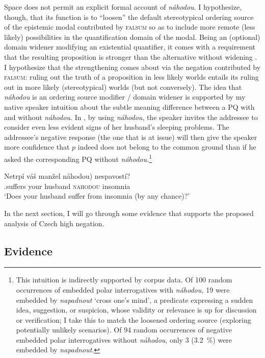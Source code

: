\documentclass[output=paper,colorlinks,citecolor=brown]{langscibook}
\begin{document}
\noindent Space does not permit an explicit formal account of \textit{náhodou}. I hypothesize, though, that its function is to ``loosen'' the default stereotypical ordering source \citep{Kratzer1991} of the epistemic modal contributed by \textsc{falsum} so as to include more remote (less likely) possibilities in the quantification domain of the modal. Being an (optional) domain widener modifying an existential quantifier, it comes with a requirement that the resulting proposition is stronger than the alternative without widening \citep{Kadmon.Landman1993,krifka1995semantics}. I hypothesize that the strengthening comes about via the negation contributed by \textsc{falsum}: ruling out the truth of a proposition in less likely worlds entails its ruling out in more likely (stereotypical) worlds (but not conversely). The idea that \textit{náhodou} is an ordering source modifier / domain widener is supported by my native speaker intuition about the subtle meaning difference between a PQ with and without \textit{náhodou.} In , by using \textit{náhodou}, the speaker invites the addressee to consider even less evident signs of her husband's sleeping problems. The addressee's negative response (the one that is at issue) will then give the speaker more confidence that $p$ indeed does not belong to the common ground than if he asked the corresponding PQ without \textit{náhodou.}\footnote{This intuition is indirectly supported by corpus data. Of 100 random occurrences of embedded polar interrogatives with \textit{náhodou,} 19 were embedded by \textit{napadnout} `cross one's mind', a predicate expressing a sudden idea, suggestion, or suspicion, whose validity or relevance is up for discussion or verification; I take this to match the loosened ordering source (exploring potentially unlikely scenarios). Of 94 random occurrences of negative embedded polar interrogatives without \textit{náhodou}, only 3 (\qty{3.2}{\percent}) were embedded by \textit{napadnout}.\label{sim:fn:nahodou}}

\ea\gll Netrpí váš manžel \minsp{(} náhodou) nespavostí?\label{sim:ex:nahodou-domain}\\
{\NEG}.suffers your husband {} \textsc{nahodou} insomnia\\
\glt `Does your husband suffer from insomnia (by any chance)?'
\z

\noindent In the next section, I will go through some evidence that supports the proposed analysis of Czech high negation.

\subsection{Evidence}
\end{document}

